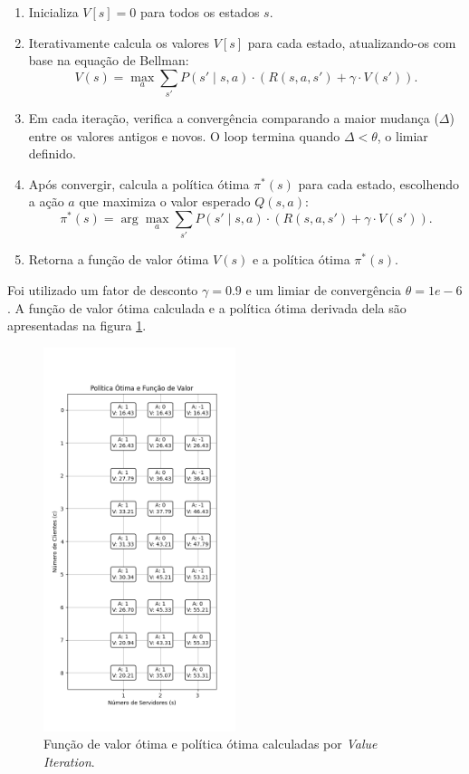 \begin{enumerate}
    \item Inicializa \( V[s] = 0 \) para todos os estados \( s \).
    \item Iterativamente calcula os valores \( V[s] \) para cada estado, atualizando-os com base na equação de Bellman:
    \[
    V(s) = \max_a \sum_{s'} P(s' \mid s, a) \cdot \left( R(s, a, s') + \gamma \cdot V(s') \right).
    \]
    \item Em cada iteração, verifica a convergência comparando a maior mudança (\( \Delta \)) entre os valores antigos e novos. O loop termina quando \( \Delta < \theta \), o limiar definido.
    \item Após convergir, calcula a política ótima \( \pi^*(s) \) para cada estado, escolhendo a ação \( a \) que maximiza o valor esperado \( Q(s, a) \):
    \[
    \pi^*(s) = \arg\max_a \sum_{s'} P(s' \mid s, a) \cdot \left( R(s, a, s') + \gamma \cdot V(s') \right).
    \]
    \item Retorna a função de valor ótima \( V(s) \) e a política ótima \( \pi^*(s) \).
\end{enumerate}

Foi utilizado um fator de desconto $\gamma = 0.9$ e um limiar de convergência $\theta = 1e-6$. A função de valor ótima calculada e a política ótima derivada dela são apresentadas na figura \ref{fig:value_iteration_policy_and_values}.

\begin{figure}[H]
    \centering
    \includegraphics[width=0.5\textwidth]{fig/value_iteration_policy_and_values.png}
    \caption{Função de valor ótima e política ótima calculadas por \textit{Value Iteration}.}
    \label{fig:value_iteration_policy_and_values}
\end{figure}

